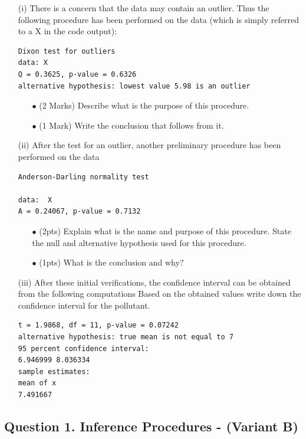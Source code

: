 \documentclass[a4paper,12pt]{article}
\begin{document}
\begin{itemize}
\item[(i)] There is a concern that the data may contain an outlier. Thus the following procedure has been
performed on the data (which is simply referred to a X in the code output):
\begin{framed}
\begin{verbatim}
Dixon test for outliers
data: X
Q = 0.3625, p-value = 0.6326
alternative hypothesis: lowest value 5.98 is an outlier
\end{verbatim}
\end{framed}
\begin{itemize}
\item[$\bullet$] (2 Marks) Describe what is the purpose of this procedure.
\item[$\bullet$] (1 Mark) Write the conclusion that follows from it.
\end{itemize}

\item[(ii)] After the test for an outlier, another preliminary procedure has been performed on the data
\begin{framed}
	\begin{verbatim}
Anderson-Darling normality test

data:  X
A = 0.24067, p-value = 0.7132
\end{verbatim}
\end{framed}
\begin{itemize}
	\item[$\bullet$] (2pts) Explain what is the name and purpose of this procedure. State the null and alternative hypothesis used for this procedure.
\item[$\bullet$] (1pts) What is the conclusion and why?
\end{itemize}
\newpage
\item[(iii)] After these initial verifications, the confidence interval can be obtained from the following computations
Based on the obtained values write down the confidence interval for the pollutant. 
\begin{framed}
\begin{verbatim}
t = 1.9868, df = 11, p-value = 0.07242
alternative hypothesis: true mean is not equal to 7
95 percent confidence interval:
6.946999 8.036334
sample estimates:
mean of x 
7.491667 
\end{verbatim}
\end{framed}
\end{itemize}
\newpage
\subsection*{Question 1. Inference Procedures - (Variant B) }
\end{document}
